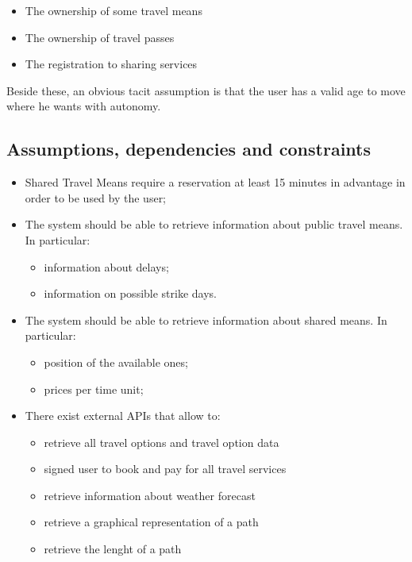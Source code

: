 \begin{itemize}
\item The ownership of some travel means
\item The ownership of travel passes
\item The registration to sharing services
\end{itemize}

Beside these, an obvious tacit assumption is that the user has a valid age to move where he wants with autonomy.


\subsection{ Assumptions, dependencies and constraints}

\begin{itemize}

\item Shared Travel Means require a reservation at least 15 minutes in advantage in order to be used by the user;

\item The system should be able to retrieve information about public travel means. In particular:
\begin{itemize}
\item information about delays;
\item information on possible strike days.
\end{itemize}

\item The system should be able to retrieve information about shared means. In particular:
\begin{itemize}
\item position of the available ones;
\item prices per time unit;
\end{itemize}

\item There exist external APIs that allow to:
\begin{itemize}
\item retrieve all travel options and travel option data
\item signed user to book and pay for all travel services
\item retrieve information about weather forecast
\item retrieve a graphical representation of a path
\item retrieve the lenght of a path
\end{itemize}


\end{itemize}
